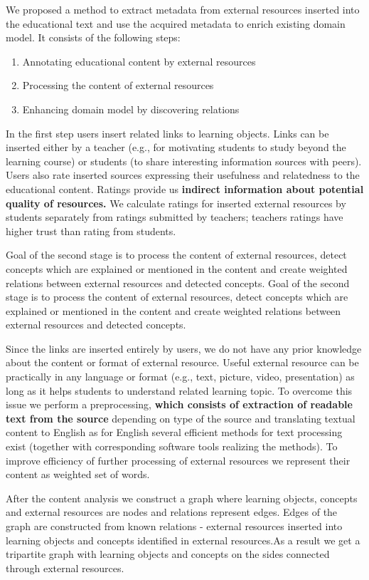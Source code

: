 \documentclass[a4, conference]{IEEEtran}
\begin{document}
We proposed a method to extract metadata from external resources inserted into the educational text and use the acquired metadata to enrich existing domain model. It consists of the following steps:
\begin{enumerate}%
\item Annotating educational content by external resources  
\item Processing the content of external resources 
\item Enhancing domain model by discovering relations
\end{enumerate} 
In the first step users insert related links to learning objects. Links can be inserted either by a teacher (e.g., for motivating students to study beyond the learning course) or students (to share interesting information sources with peers). Users also rate inserted sources expressing their usefulness and relatedness to the educational content. Ratings provide us \textbf {indirect information about potential quality of resources.} We calculate ratings for inserted external resources by students separately from ratings submitted by teachers; teacher\textsc{}s ratings have higher trust than rating from students.

Goal of the second stage is to process the content of external resources, detect concepts which are explained or mentioned in the content and create weighted relations between external resources and detected concepts.  Goal of the second stage is to process the content of external resources, detect concepts which are explained or mentioned in the content and create weighted relations between external resources and detected concepts.

Since the links are inserted entirely by users, we do not have any prior knowledge about the content or format of external resource. Useful external resource can be practically in any language or format (e.g., text, picture, video, presentation) as long as it helps students to understand related learning topic. To overcome this issue we perform a preprocessing, \textbf {which consists of extraction of readable text from the source} depending on type of the source and translating textual content to English as for English several efficient methods for text processing exist (together with corresponding software tools realizing the methods). To improve efficiency of further processing of external resources we represent their content as weighted set of words.

After the content analysis we construct a graph where learning objects, concepts and external resources are nodes and relations represent edges. Edges of the graph are constructed from known relations - external resources inserted into learning objects and concepts identified in external resources.As a result we get a tripartite graph with learning objects and concepts on the sides connected through external resources.
\end{document}
